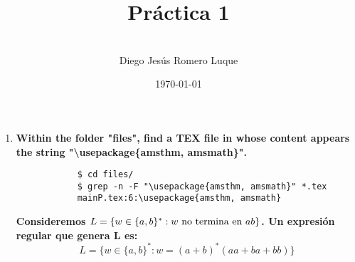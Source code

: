 \documentclass{article}
\title{\textbf{Pr\'actica 1}}
\author{\\Diego Jes\'us Romero Luque}
\date{\today}
\begin{document}
\maketitle
\pagebreak

\begin{enumerate}
    \item \textbf{Within the folder "files", find a TEX file in whose content appears 
           the string "\textbackslash usepackage\{amsthm, amsmath\}".}
        \begin{verbatim}
            $ cd files/
            $ grep -n -F "\usepackage{amsthm, amsmath}" *.tex
            mainP.tex:6:\usepackage{amsthm, amsmath} 
        \end{verbatim}
        \textbf{Consideremos $L=\{w\in \{a,b\}^* : w \textnormal{ no termina en } ab\}$. Un expresión 
         regular que genera L es:} \\
            \begin{equation*}
                L=\{w \in \{a,b\}^* : w=(a+b)^*(aa+ba+bb)\}
            \end{equation*}
    
    \end{enumerate}
\end{document}
